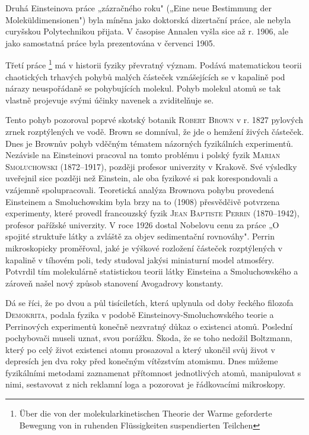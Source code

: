         Druhá Einsteinova práce „zázračného roku"  („Eine neue
        Bestimmung der Moleküldimensionen") byla míněna jako doktorská dizertační práce, ale nebyla
        curyšskou Polytechnikou přijata. V časopise Annalen vyšla sice až r. 1906, ale jako
        samostatná práce byla prezentována v červenci 1905.

        Třetí práce \emph{}\footnote{Über die von der molekularkinetischen Theorie
        der Warme geforderte Bewegung von in ruhenden Flüssigkeiten suspendierten Teilchen} má v
        historii fyziky převratný význam. Podává matematickou teorii chaotických trhavých pohybů
        malých částeček vznášejících se v kapalině pod nárazy neuspořádaně se pohybujících molekul.
        Pohyb molekul atomů se tak vlastně projevuje svými účinky navenek a zviditelňuje se.

        Tento pohyb pozoroval poprvé skotský botanik \textsc{Robert Brown} v r. 1827 pylových zrnek
        rozptýlených ve vodě. Brown se domníval, že jde o hemžení živých částeček. Dnes je Brownův
        pohyb vděčným tématem názorných fyzikálních experimentů. Nezávisle na Einsteinovi pracoval
        na tomto problému i polský fyzik \textsc{Marian Smoluchowski} (1872–1917), později profesor
        univerzity v Krakově. Své výsledky uveřejnil sice později než Einstein, ale oba fyzikové si
        pak korespondovali a vzájemně spolupracovali. Teoretická analýza Brownova pohybu provedená
        Einsteinem a Smoluchowskim byla brzy na to (1908) přesvědčivě potvrzena experimenty, které
        provedl francouzský fyzik \textsc{Jean Baptiste Perrin} (1870–1942), profesor pařížské
        univerzity. V roce 1926 dostal Nobelovu cenu za práce „O spojité struktuře látky a zvláště
        za objev sedimentační rovnováhy". Perrin mikroskopicky proměřoval, jaké je výškové rozložení
        částeček rozptýlených v kapalině v tíhovém poli, tedy studoval jakýsi miniaturní model
        atmosféry. Potvrdil tím molekulárně statistickou teorii látky Einsteina a Smoluchowského a
        zároveň našel nový způsob stanovení Avogadrovy konstanty. 
        
        Dá se říci, že po dvou a půl tisíciletích, která uplynula od doby řeckého filozofa
        \textsc{Demokrita}, podala fyzika v podobě Einsteinovy-Smoluchowského teorie a Perrinových
        experimentů konečně nezvratný důkaz o existenci atomů. Poslední pochybovači museli uznat,
        svou porážku. Škoda, že se toho nedožil Boltzmann, který po celý život existenci atomu
        prosazoval a který ukončil svůj život v depresích jen dva roky před konečným vítězstvím
        atomismu. Dnes můžeme fyzikálními metodami zaznamenat přítomnost jednotlivých atomů,
        manipulovat s nimi, sestavovat z nich reklamní loga a pozorovat je řádkovacími mikroskopy.
        
